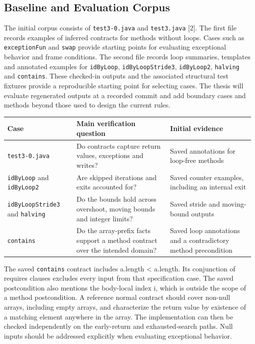 \documentclass[11pt,a4paper]{article}
\begin{document}
\subsection{Baseline and Evaluation Corpus}
\label{sec:evaluation-corpus}
The initial corpus consists of \texttt{test3-0.java} and \texttt{test3.java} [2]. The first file records examples of inferred contracts for methods without loops. Cases such as \texttt{exceptionFun} and \texttt{swap} provide starting points for evaluating exceptional behavior and frame conditions. The second file records loop summaries, templates and annotated examples for \texttt{idByLoop}, \texttt{idByLoopStride3}, \texttt{idByLoop2}, \texttt{halving} and \texttt{contains}. These checked-in outputs and the associated structural test fixtures provide a reproducible starting point for selecting cases. The thesis will evaluate regenerated outputs at a recorded commit and add boundary cases and methods beyond those used to design the current rules.

\begin{center}
\small
\renewcommand{\arraystretch}{1.24}
\begin{tabularx}{\linewidth}{@{}>{\raggedright\arraybackslash}p{.23\linewidth} >{\raggedright\arraybackslash}X >{\raggedright\arraybackslash}p{.29\linewidth}@{}}
\hline
\textbf{Case} & \textbf{Main verification question} & \textbf{Initial evidence} \\
\hline
\texttt{test3-0.java} & Do contracts capture return values, exceptions and writes? & Saved annotations for loop-free methods \\
\texttt{idByLoop} and \texttt{idByLoop2} & Are skipped iterations and exits accounted for? & Saved counter examples, including an internal exit \\
\texttt{idByLoopStride3} and \texttt{halving} & Do the bounds hold across overshoot, moving bounds and integer limits? & Saved stride and moving-bound outputs \\
\texttt{contains} & Do the array-prefix facts support a method contract over the intended domain? & Saved loop annotations and a contradictory method precondition \\
\hline
\end{tabularx}
\end{center}
The saved \texttt{contains} contract includes a.length \textless{} a.length. Its conjunction of requires clauses excludes every input from that specification case. The saved postcondition also mentions the body-local index i, which is outside the scope of a method postcondition. A reference normal contract should cover non-null arrays, including empty arrays, and characterize the return value by existence of a matching element anywhere in the array. The implementation can then be checked independently on the early-return and exhausted-search paths. Null inputs should be addressed explicitly when evaluating exceptional behavior.
\end{document}
